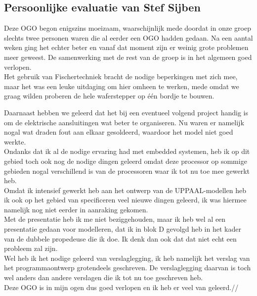 \subsection{Persoonlijke evaluatie van Stef Sijben}

Deze OGO begon enigszins moeizaam, waarschijnlijk mede doordat in
onze groep slechts twee personen waren die al eerder een OGO hadden
gedaan. Na een aantal weken ging het echter beter en vanaf dat
moment zijn er weinig grote problemen meer geweest. De samenwerking
met de rest van de groep is in het algemeen goed verlopen.\\

Het gebruik van Fischertechniek bracht de nodige beperkingen met
zich mee, maar het was een leuke uitdaging om hier omheen te werken,
mede omdat we graag wilden proberen de hele waferstepper op \'e\'en
bordje te bouwen.

Daarnaast hebben we geleerd dat het bij een eventueel volgend
project handig is om de elektrische aansluitingen wat beter te
organiseren. Nu waren er namelijk nogal wat draden fout aan elkaar
gesoldeerd, waardoor het model niet goed werkte.\\

Ondanks dat ik al de nodige ervaring had met embedded systemen, heb
ik op dit gebied toch ook nog de nodige dingen geleerd omdat deze
processor op sommige gebieden nogal verschillend is van de
processoren waar ik tot nu toe mee gewerkt heb.\\

Omdat ik intensief gewerkt heb aan het ontwerp van de
UPPAAL-modellen heb ik ook op het gebied van specificeren veel
nieuwe dingen geleerd, ik was hiermee namelijk nog niet eerder in
aanraking gekomen.\\

Met de presentatie heb ik me niet beziggehouden, maar ik heb wel al
een presentatie gedaan voor modelleren, dat ik in blok D gevolgd heb
in het kader van de dubbele propedeuse die ik doe. Ik denk dan ook
dat dat niet echt een probleem zal zijn.\\

Wel heb ik het nodige geleerd van verslaglegging, ik heb namelijk
het verslag van het programmaontwerp grotendeels geschreven. De
verslaglegging daarvan is toch wel anders dan andere verslagen die
ik tot nu toe geschreven heb.\\

Deze OGO is in mijn ogen dus goed verlopen en ik heb er veel van
geleerd.//
